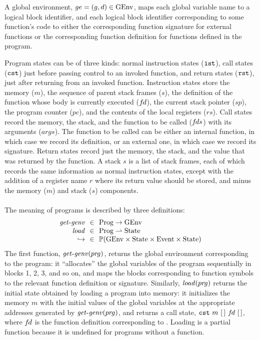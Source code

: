 A global environment, $ge=(g,d)\in\mathrm{GEnv}$, maps each global variable name to a logical block
identifier, and each logical block identifier corresponding to some function's code to either the
corresponding function signature for external functions or the corresponding function definition for
functions defined in the program.

Program states can be of three kinds: normal instruction states ($\mathtt{ist}$), call states ($\mathtt{cst}$)
just before passing control to an invoked function, and return states ($\mathtt{rst}$), just after
returning from an invoked function.  Instruction states store the memory ($m$), the sequence of
parent stack frames ($s$), the definition of the function whose body is currently executed (${f\hspace*{-1pt}d}$),
the current stack pointer ($sp$), the program counter ($pc$), and the contents of the local
registers ($rs$).  Call states record the memory, the stack, and the function to be called (${f\hspace*{-1pt}ds}$)
with its arguments ($args$).  The function to be called can be either an internal function, in which
case we record its definition, or an external one, in which case we record its signature.  Return
states record just the memory, the stack, and the value that was returned by the function.  A stack
$s$ is a list of stack frames, each of which records the same information as normal instruction
states, except with the addition of a register name $r$ where its return value should be stored, and
minus the memory ($m$) and stack ($s$) components.

\paragraph*{}

The meaning of programs is described by three definitions:
\[
\begin{array}{r@{~~}c@{~~}l}
\rtlgenv &\in& \rtlProg \to \rtlGEnv \\
\rtlload &\in& \rtlProg \pfun \rtlState\\
\estep{} &\in& \powset{\rtlGEnv\times\rtlState\times\rtlEvent\times\rtlState}\\
\end{array}
\]
The first function, $\mathit{get\text{-}genv}({pr\hspace*{-1pt}g})$, returns the global environment corresponding to the program:
it ``allocates'' the global variables of the program sequentially in blocks 1, 2, 3, and so on, and
maps the blocks corresponding to function symbols to the relevant function definition or signature.
Similarly, $\mathit{load}({pr\hspace*{-1pt}g})$ returns the initial state obtained by loading a program into memory: it
initializes the memory $m$ with the initial values of the global variables at the appropriate
addresses generated by $\mathit{get\text{-}genv}({pr\hspace*{-1pt}g})$, and returns a call state, $\mathtt{cst}~m~[\,]~{f\hspace*{-1pt}d}~[\,]$,
where ${f\hspace*{-1pt}d}$ is the function definition corresponding to .  Loading is a partial
function because it is undefined for programs without a  function.

